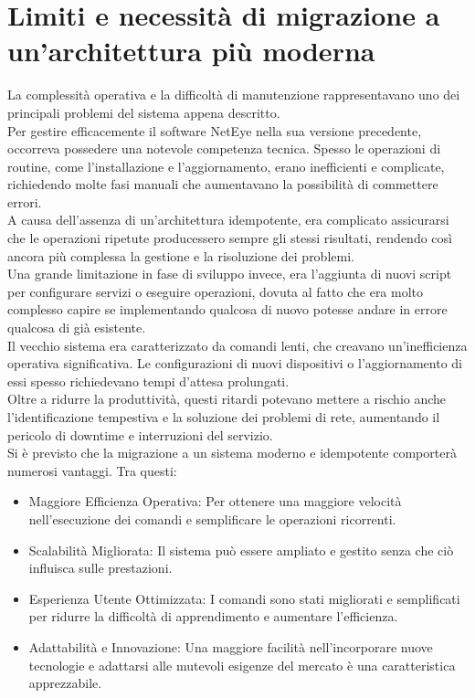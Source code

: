\section{Limiti e necessità di migrazione a un'architettura più moderna}
\label{sec:necessita_di_migrazione} La complessità operativa e la difficoltà di manutenzione
rappresentavano uno dei principali problemi del sistema appena descritto.\\ Per gestire
efficacemente il software NetEye nella sua versione precedente, occorreva
possedere una notevole competenza tecnica. Spesso le operazioni di routine, come
l'installazione e l'aggiornamento, erano inefficienti e complicate, richiedendo
molte fasi manuali che aumentavano la possibilità di commettere errori.\\ A
causa dell'assenza di un'architettura idempotente, era complicato assicurarsi che
le operazioni ripetute producessero sempre gli stessi risultati, rendendo così
ancora più complessa la gestione e la risoluzione dei problemi.\\ Una grande
limitazione in fase di sviluppo invece, era l'aggiunta di nuovi script per configurare
servizi o eseguire operazioni, dovuta al fatto che era molto complesso capire se
implementando qualcosa di nuovo potesse andare in errore qualcosa di già
esistente.\\ Il vecchio sistema era caratterizzato da comandi lenti, che creavano
un'inefficienza operativa significativa. Le configurazioni di nuovi dispositivi
o l'aggiornamento di essi spesso richiedevano tempi d'attesa prolungati.\\ Oltre
a ridurre la produttività, questi ritardi potevano mettere a rischio anche l'identificazione
tempestiva e la soluzione dei problemi di rete, aumentando il pericolo di
downtime e interruzioni del servizio.\\ Si è previsto che la migrazione a un
sistema moderno e idempotente comporterà numerosi vantaggi. Tra questi:
\begin{itemize}
  \item Maggiore Efficienza Operativa: Per ottenere una maggiore velocità nell'esecuzione
    dei comandi e semplificare le operazioni ricorrenti.

  \item Scalabilità Migliorata: Il sistema può essere ampliato e gestito senza
    che ciò influisca sulle prestazioni.

  \item Esperienza Utente Ottimizzata: I comandi sono stati migliorati e
    semplificati per ridurre la difficoltà di apprendimento e aumentare l'efficienza.

  \item Adattabilità e Innovazione: Una maggiore facilità nell'incorporare nuove
    tecnologie e adattarsi alle mutevoli esigenze del mercato è una
    caratteristica apprezzabile.
\end{itemize}
